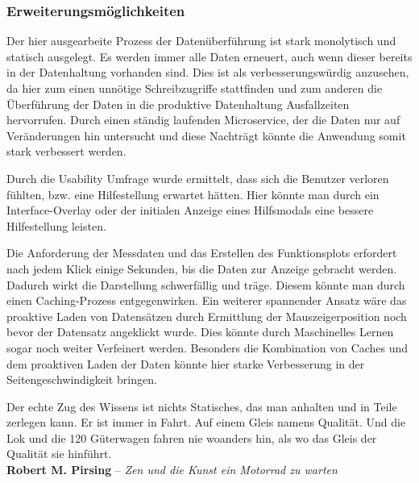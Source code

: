 \subsubsection{Erweiterungsmöglichkeiten}

Der hier ausgearbeite Prozess der Datenüberführung ist stark monolytisch und statisch ausgelegt. Es werden immer alle Daten erneuert, auch wenn dieser bereits in der Datenhaltung vorhanden sind. Dies ist als verbesserungswürdig anzusehen, da hier zum einen unnötige Schreibzugriffe stattfinden und zum anderen die Überführung der Daten in die produktive Datenhaltung Ausfallzeiten hervorrufen. Durch einen ständig laufenden Microservice, der die Daten nur auf Veränderungen hin untersucht und diese Nachträgt könnte die Anwendung somit stark verbessert werden. 


Durch die Usability Umfrage wurde ermittelt, dass sich die Benutzer verloren fühlten, bzw. eine Hilfestellung erwartet hätten. Hier könnte man durch ein Interface-Overlay oder der initialen Anzeige eines Hilfsmodals eine bessere Hilfestellung leisten.

Die Anforderung der Messdaten und das Erstellen des Funktionsplots erfordert nach jedem Klick einige Sekunden, bis die Daten zur Anzeige gebracht werden. Dadurch wirkt die Darstellung schwerfällig und träge. Diesem könnte man durch einen Caching-Prozess entgegenwirken. Ein weiterer spannender Ansatz wäre das proaktive Laden von Datensätzen durch Ermittlung der Mauszeigerposition noch bevor der Datensatz angeklickt wurde. Dies könnte durch Maschinelles Lernen sogar noch weiter Verfeinert werden. Besonders die Kombination von Caches und dem proaktiven Laden der Daten könnte hier starke Verbesserung in der Seitengeschwindigkeit bringen. 



\newpage


\vspace*{\fill}\thispagestyle{plain}
Der echte Zug des Wissens ist nichts Statisches, das man anhalten und in Teile zerlegen kann. Er ist immer in Fahrt. Auf einem Gleis namens Qualität. Und die Lok und die 120 Güterwagen fahren nie woanders hin, als wo das Gleis der Qualität sie hinführt.
\\
\hrulefill \vspace{0.3cm}
\textbf{Robert M. Pirsing} -- \textit{Zen und die Kunst ein Motorrad zu warten}
\vspace*{\fill}

